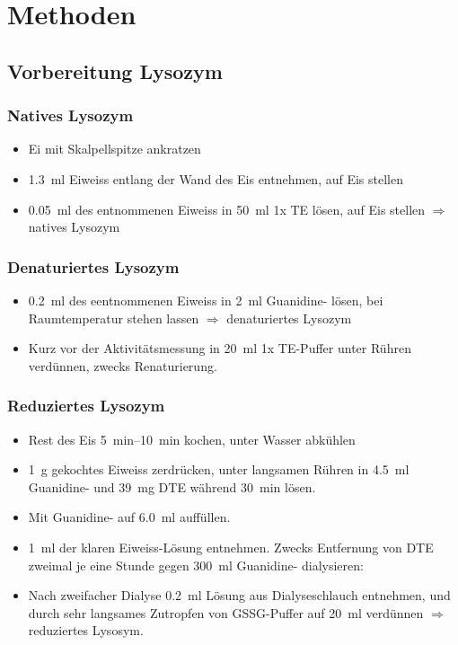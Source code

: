 \documentclass[a4paper,german]{scrreprt}
\begin{document}
\chapter{Methoden}

\section{Vorbereitung Lysozym}

\subsection{Natives Lysozym}

\begin{itemize}
	\item Ei mit Skalpellspitze ankratzen
	\item \SI{1.3}{ml} Eiweiss entlang der Wand des Eis entnehmen, auf Eis stellen
	\item \SI{0.05}{ml} des entnommenen Eiweiss in \SI{50}{ml} 1x TE lösen,
		auf Eis stellen $\Rightarrow$ natives Lysozym
\end{itemize}

\subsection{Denaturiertes Lysozym}

\begin{itemize}
	\item \SI{0.2}{ml} des eentnommenen Eiweiss in \SI{2}{ml}
		Guanidine- lösen, bei Raumtemperatur stehen lassen
		$\Rightarrow$ denaturiertes Lysozym
	\item Kurz vor der Aktivitätsmessung in \SI{20}{ml} 1x TE-Puffer unter
		Rühren verdünnen, zwecks Renaturierung.
\end{itemize}

\subsection{Reduziertes Lysozym}

\begin{itemize}
	\item Rest des Eis \SIrange{5}{10}{min} kochen, unter Wasser abkühlen
	\item \SI{1}{g} gekochtes Eiweiss zerdrücken, unter langsamen Rühren in
		\SI{4.5}{ml} Guanidine- und \SI{39}{mg} DTE während
		\SI{30}{min} lösen.
	\item Mit Guanidine- auf \SI{6.0}{ml} auffüllen.
	\item \SI{1}{ml} der klaren Eiweiss-Lösung entnehmen. Zwecks Entfernung
		von DTE zweimal je eine Stunde gegen \SI{300}{ml}
		Guanidine- dialysieren:
	\item Nach zweifacher Dialyse \SI{0.2}{ml} Lösung aus Dialyseschlauch
		entnehmen, und durch sehr langsames Zutropfen von GSSG-Puffer
		auf \SI{20}{ml} verdünnen $\Rightarrow$ reduziertes Lysosym.
\end{itemize}
\end{document}
